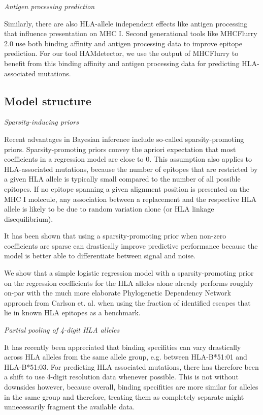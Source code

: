 \documentclass[fleqn,11pt]{SelfArx} %
\begin{document}
  \textit{Antigen processing prediction}
  
  Similarly, there are also HLA-allele independent effects like antigen processing
  that influence presentation on MHC I. Second generational tools like
  MHCFlurry 2.0 use both binding affinity and antigen processing data to improve
  epitope prediction. For our tool HAMdetector, we use the output of MHCFlurry to
  benefit from this binding affinity and antigen processing data for predicting
  HLA-associated mutations.


\subsection*{Model structure}

  \textit{Sparsity-inducing priors}
  
  Recent advantages in Bayesian inference include so-called sparsity-promoting priors.
  Sparsity-promoting priors convey the apriori expectation that most coefficients in 
  a regression model are close to 0.
  This assumption also applies to HLA-associated mutations, because the number of epitopes
  that are restricted by a given HLA allele is typically small compared to the number
  of all possible epitopes. If no epitope spanning a given alignment position is presented
  on the MHC I molecule, any association between a replacement and the respective HLA allele 
  is likely to be due to random variation alone (or HLA linkage disequilibrium).
  
  It has been shown that using a sparsity-promoting prior when non-zero coefficients
  are sparse can drastically improve predictive performance because the model is
  better able to differentiate between signal and noise.

  We show that a simple logistic regression model with a sparsity-promoting prior
  on the regression coefficients for the HLA alleles alone already performs roughly on-par 
  with the much more elaborate Phylogenetic Dependency Network approach from Carlson et. al.
  when using the fraction of identified escapes that lie in known HLA epitopes as a
  benchmark.

  \textit{Partial pooling of 4-digit HLA alleles}
  
  It has recently been appreciated that binding specifities can vary drastically across 
  HLA alleles from the same allele group, e.g. between HLA-B*51:01 and HLA-B*51:03.
  For predicting HLA associated mutations, there has therefore been a shift to use
  4-digit resolution data whenever possible.
  This is not without downsides however, because overall, binding specifities
  are more similar for alleles in the same group and therefore, treating them
  as completely separate might unnecessarily fragment the available data.
\end{document}
